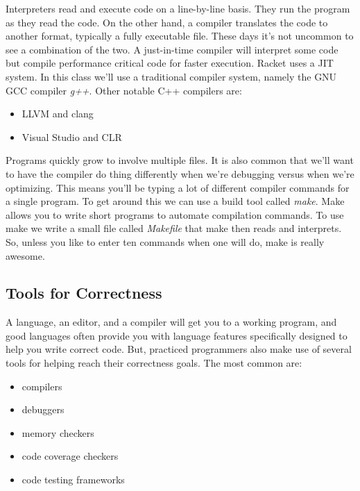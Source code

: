\documentclass[]{tufte-handout}
\begin{document}
Interpreters read and execute code on a line-by-line basis. They run the program as they read the code. On the other hand, a compiler translates the code to another format, typically a fully executable file. These days it's not uncommon to see a combination of the two. A just-in-time compiler will interpret some code but compile performance critical code for faster execution. Racket uses a JIT system.  In this class we'll use a traditional compiler system, namely the GNU GCC compiler \textit{g++}. Other notable C++ compilers are:
\begin{itemize}
\item LLVM and clang 	
\item Visual Studio and CLR 
\end{itemize}

Programs quickly grow to involve multiple files. It is also common that we'll want to have the compiler do thing differently when we're debugging versus when we're optimizing. This means you'll be typing a lot of different compiler commands for a single program.  To get around this we can use a build tool called \textit{make}.  Make allows you to write short programs to automate compilation commands. To use make we write a small file called \textit{Makefile} that make then reads and interprets.  So, unless you like to enter ten commands when one will do, make is really awesome.


\subsection{Tools for Correctness}

A language, an editor, and a compiler will get you to a working program, and good languages often provide you with language features specifically designed to help you write correct code. But, practiced programmers also make use of several tools for helping reach their correctness goals.  The most common are:
\begin{itemize}
\item compilers
\item debuggers
\item memory checkers
\item code coverage checkers
\item code testing frameworks
\end{itemize}
\end{document}
